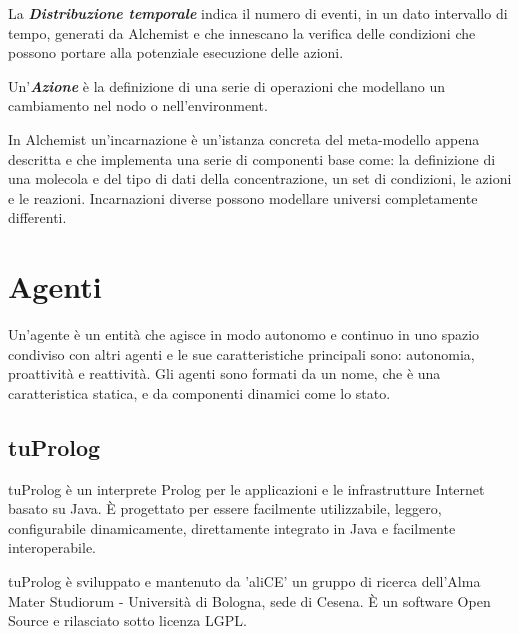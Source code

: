 \documentclass[12pt,a4paper,openright,twoside]{report}
\begin{document}
La \textbf{\textit{Distribuzione temporale}} indica il numero di eventi, in un dato intervallo di tempo, generati da Alchemist e che innescano la verifica delle condizioni che possono portare alla potenziale esecuzione delle azioni.

Un'\textbf{\textit{Azione}} \`e la definizione di una serie di operazioni che modellano un cambiamento nel nodo o nell'environment.

In Alchemist un'incarnazione \`e un'istanza concreta del meta-modello appena descritta e che implementa una serie di componenti base come: la definizione di una molecola e del tipo di dati della concentrazione, un set di condizioni, le azioni e le reazioni. Incarnazioni diverse possono modellare universi completamente differenti.

\chapter{Agenti}
\lhead[\fancyplain{}{\bfseries\thepage}]{\fancyplain{}{\bfseries\rightmark}}

Un'agente \`e un entit\`a che agisce in modo autonomo e continuo in uno spazio condiviso con altri agenti e le sue caratteristiche principali sono: autonomia, proattivit\`a e reattivit\`a. Gli agenti sono formati da un nome, che \`e una caratteristica statica, e da componenti dinamici come lo stato.

\section{tuProlog}
tuProlog \`e un interprete Prolog per le applicazioni e le infrastrutture Internet basato su Java. \`E progettato per essere facilmente utilizzabile, leggero, configurabile dinamicamente, direttamente integrato in Java e facilmente interoperabile.

tuProlog \`e sviluppato e mantenuto da 'aliCE' un gruppo di ricerca dell'Alma Mater Studiorum - Universit\`a di Bologna, sede di Cesena. \`E un software Open Source e rilasciato sotto licenza LGPL.
\end{document}
